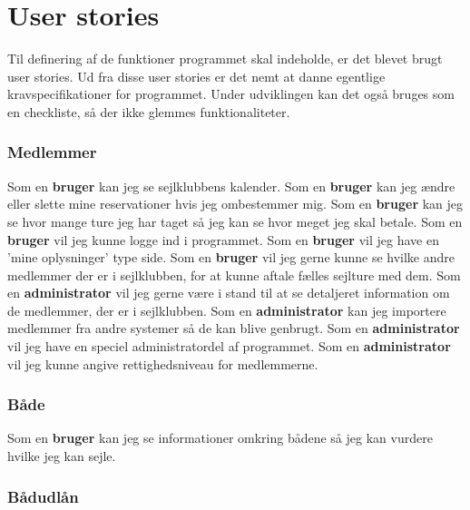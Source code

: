 \chapter{User stories}\label{User_stories}
Til definering af de funktioner programmet skal indeholde, er det blevet brugt user stories. 
Ud fra disse user stories er det nemt at danne egentlige kravspecifikationer for programmet. 
Under udviklingen kan det også bruges som en checkliste, så der ikke glemmes funktionaliteter. 

\subsection{Medlemmer}
Som en \textbf{bruger} kan jeg se sejlklubbens kalender.
\newline
Som en \textbf{bruger} kan jeg ændre eller slette mine reservationer hvis jeg ombestemmer mig.
\newline
Som en \textbf{bruger} kan jeg se hvor mange ture jeg har taget så jeg kan se hvor meget jeg skal betale.
\newline
Som en \textbf{bruger} vil jeg kunne logge ind i programmet.
\newline
Som en \textbf{bruger} vil jeg have en 'mine oplysninger' type side.
\newline
Som en \textbf{bruger} vil jeg gerne kunne se hvilke andre medlemmer der er i sejlklubben, for at kunne aftale fælles sejlture med dem.
\newline
Som en \textbf{administrator} vil jeg gerne være i stand til at se detaljeret information om de medlemmer, der er i sejlklubben.
\newline
Som en \textbf{administrator} kan jeg importere medlemmer fra andre systemer så de kan blive genbrugt.
\newline
Som en \textbf{administrator} vil jeg have en speciel administratordel af programmet.
\newline
Som en \textbf{administrator} vil jeg kunne angive rettighedsniveau for medlemmerne.

\subsection{Både}

Som en \textbf{bruger} kan jeg se informationer omkring bådene så jeg kan vurdere hvilke jeg kan sejle.

\subsection{Bådudlån}

